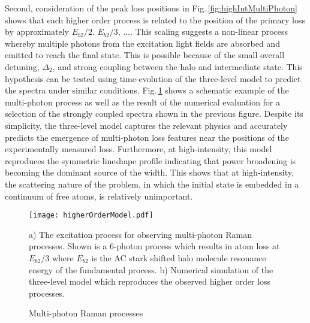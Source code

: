 Second, consideration of the peak loss positions in Fig.\,\ref{fig:highIntMultiPhoton} shows that each higher order process is related to the position of the primary loss by approximately $E_{b2}/2$. $E_{b2}/3$, $\dots$.
This scaling suggests a non-linear process whereby multiple photons from the excitation light fields are absorbed and emitted to reach the final state.
This is possible because of the small overall detuning, $\Delta_2$, and strong coupling between the halo and intermediate state.
This hypothesis can be tested using time-evolution of the three-level model to predict the spectra under similar conditions.
Fig.\,\ref{fig:multiPhotonTheory} shows a schematic example of the multi-photon process as well as the result of the numerical evaluation for a selection of the strongly coupled spectra shown in the previous figure.
Despite its simplicity, the three-level model captures the relevant physics and accurately predicts the emergence of multi-photon loss features near the positions of the experimentally measured loss.
Furthermore, at high-intensity, this model reproduces the symmetric lineshape profile indicating that power broadening is becoming the dominant source of the width.
This shows that at high-intensity, the scattering nature of the problem, in which the initial state is embedded in a continuum of free atoms, is relatively unimportant.
	\begin{figure} 
	\centerline{
	  \texttt{[image: higherOrderModel.pdf]}}
	  \caption{Multi-photon Raman processes}{a) The excitation process for observing multi-photon Raman processes. Shown is a 6-photon process which results in atom loss at $E_{b2}/3$ where $E_{b2}$ is the AC stark shifted halo molecule resonance energy of the fundamental process. b) Numerical simulation of the three-level model which reproduces the observed higher order loss processes.}
	  \label{fig:multiPhotonTheory}
	\end{figure}




%
%
%
%
%
	
